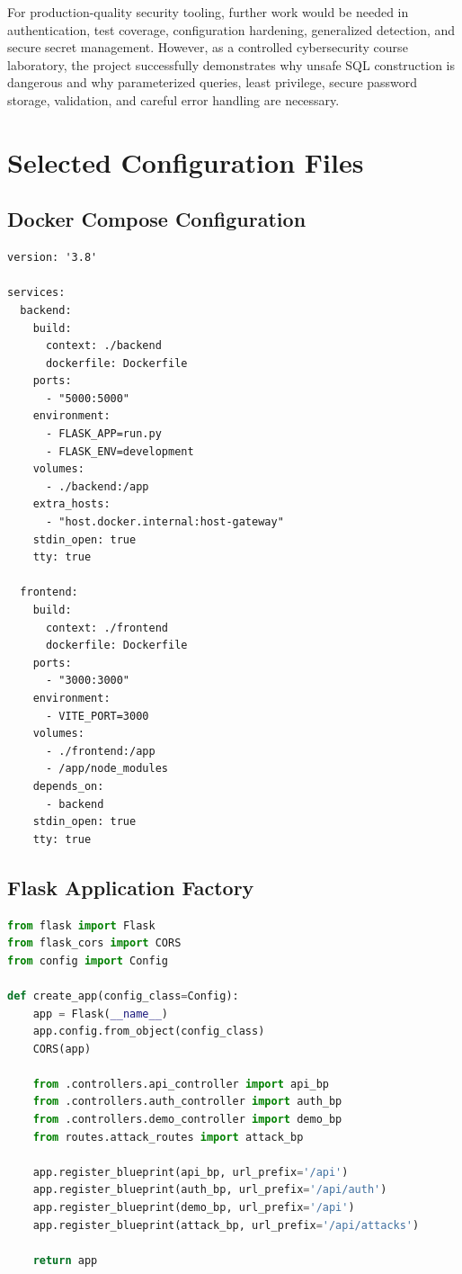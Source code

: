 \documentclass[12pt,a4paper]{article}
\begin{document}
For production-quality security tooling, further work would be needed in authentication, test coverage, configuration hardening, generalized detection, and secure secret management. However, as a controlled cybersecurity course laboratory, the project successfully demonstrates why unsafe SQL construction is dangerous and why parameterized queries, least privilege, secure password storage, validation, and careful error handling are necessary.

\appendix
\section{Selected Configuration Files}

\subsection{Docker Compose Configuration}

\begin{lstlisting}[caption={Project Docker Compose configuration}]
version: '3.8'

services:
  backend:
    build:
      context: ./backend
      dockerfile: Dockerfile
    ports:
      - "5000:5000"
    environment:
      - FLASK_APP=run.py
      - FLASK_ENV=development
    volumes:
      - ./backend:/app
    extra_hosts:
      - "host.docker.internal:host-gateway"
    stdin_open: true
    tty: true

  frontend:
    build:
      context: ./frontend
      dockerfile: Dockerfile
    ports:
      - "3000:3000"
    environment:
      - VITE_PORT=3000
    volumes:
      - ./frontend:/app
      - /app/node_modules
    depends_on:
      - backend
    stdin_open: true
    tty: true
\end{lstlisting}

\subsection{Flask Application Factory}

\begin{lstlisting}[language=Python,caption={Simplified Flask application factory}]
from flask import Flask
from flask_cors import CORS
from config import Config

def create_app(config_class=Config):
    app = Flask(__name__)
    app.config.from_object(config_class)
    CORS(app)

    from .controllers.api_controller import api_bp
    from .controllers.auth_controller import auth_bp
    from .controllers.demo_controller import demo_bp
    from routes.attack_routes import attack_bp

    app.register_blueprint(api_bp, url_prefix='/api')
    app.register_blueprint(auth_bp, url_prefix='/api/auth')
    app.register_blueprint(demo_bp, url_prefix='/api')
    app.register_blueprint(attack_bp, url_prefix='/api/attacks')

    return app
\end{lstlisting}
\end{document}
